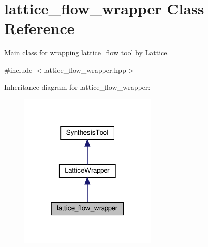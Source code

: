\hypertarget{classlattice__flow__wrapper}{}\section{lattice\+\_\+flow\+\_\+wrapper Class Reference}
\label{classlattice__flow__wrapper}


Main class for wrapping lattice\+\_\+flow tool by Lattice.  




{\ttfamily \#include $<$lattice\+\_\+flow\+\_\+wrapper.\+hpp$>$}



Inheritance diagram for lattice\+\_\+flow\+\_\+wrapper\+:
\nopagebreak
\begin{figure}[H]
\begin{center}
\leavevmode
\includegraphics[width=186pt]{d3/dca/classlattice__flow__wrapper__inherit__graph}
\end{center}
\end{figure}


